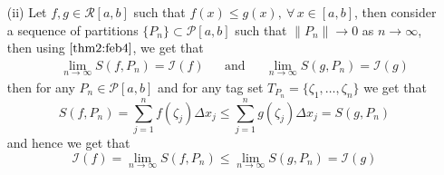 \begin{prf}
\begin{enumerate}
    \item[(ii)] Let $f,g \in \mathcal{R}[a,b]$ such that $f(x) \leq g(x), \ \forall \, x \in [a,b]$, then consider a sequence of partitions $\{P_n\} \subset \mathcal{P}[a,b]$ such that $\|P_n\| \to 0$ as $n \to \infty$, then using  $\ref{thm2:feb4}$, we get that 
    \begin{align*}
        &&\lim_{n\to\infty} S(f,P_n) = \mathcal{I}(f) &&\mbox{and} &&\lim_{n\to\infty} S(g,P_n) = \mathcal{I}(g)    
    \end{align*} 
    then for any $P_n \in \mathcal{P}[a,b]$ and for any tag set $T_{P_n} = \{\zeta_1, \dots, \zeta_n\}$ we get that 
    \[ 
        S(f,P_n) = \sum_{j=1}^n f(\zeta_j) \Delta x_j \leq \sum_{j=1}^n g(\zeta_j) \Delta x_j = S(g,P_n)    
    \] 
    and hence we get that 
    \[
        \mathcal{I}(f) = \lim_{n\to\infty} S(f,P_n) \leq \lim_{n\to\infty} S(g,P_n) = \mathcal{I}(g)  
    \] 


\end{enumerate}
\end{prf}
